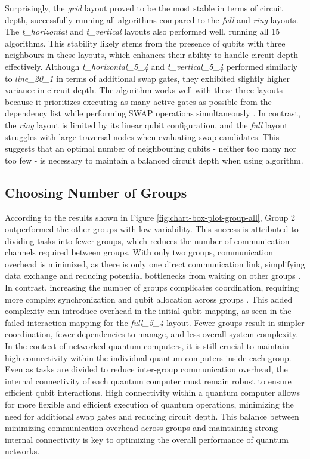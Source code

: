 Surprisingly, the \textit{grid} layout proved to be the most stable in terms of circuit depth, successfully running all algorithms compared to the \textit{full} and \textit{ring} layouts. The \textit{t\_horizontal} and \textit{t\_vertical} layouts also performed well, running all 15 algorithms. This stability likely stems from the presence of qubits with three neighbours in these layouts, which enhances their ability to handle circuit depth effectively. Although \textit{t\_horizontal\_5\_4} and \textit{t\_vertical\_5\_4} performed similarly to \textit{line\_20\_1} in terms of additional swap gates, they exhibited slightly higher variance in circuit depth. The  algorithm works well with these three layouts because it prioritizes executing as many active gates as possible from the dependency list while performing SWAP operations simultaneously \cite{zhang_depth_2020}. In contrast, the \textit{ring} layout is limited by its linear qubit configuration, and the \textit{full} layout struggles with large traversal nodes when evaluating swap candidates. This suggests that an optimal number of neighbouring qubits - neither too many nor too few - is necessary to maintain a balanced circuit depth when using  algorithm. \\
\subsection{Choosing Number of Groups}
According to the results shown in Figure \ref{fig:chart-box-plot-group-all}, Group 2 outperformed the other groups with low variability. This success is attributed to dividing tasks into fewer groups, which reduces the number of communication channels required between groups. With only two groups, communication overhead is minimized, as there is only one direct communication link, simplifying data exchange and reducing potential bottlenecks from waiting on other groups \cite{cuomo_optimized_2023}. In contrast, increasing the number of groups complicates coordination, requiring more complex synchronization and qubit allocation across groups \cite{cicconetti_resource_2022}. This added complexity can introduce overhead in the initial qubit mapping, as seen in the failed interaction mapping for the \textit{full\_5\_4} layout. Fewer groups result in simpler coordination, fewer dependencies to manage, and less overall system complexity. \\
In the context of networked quantum computers, it is still crucial to maintain high connectivity within the individual quantum computers inside each group. Even as tasks are divided to reduce inter-group communication overhead, the internal connectivity of each quantum computer must remain robust to ensure efficient qubit interactions. High connectivity within a quantum computer allows for more flexible and efficient execution of quantum operations, minimizing the need for additional swap gates and reducing circuit depth. This balance between minimizing communication overhead across groups and maintaining strong internal connectivity is key to optimizing the overall performance of quantum networks.

